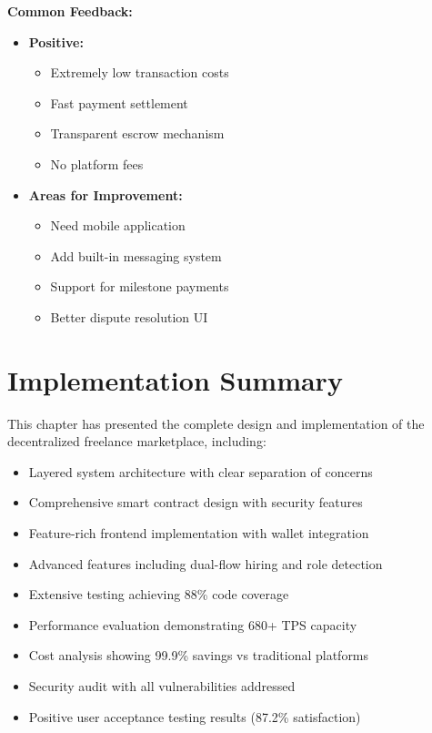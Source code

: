 \documentclass[a4paper,13pt,twoside]{report}
\theoremstyle{definition}
\begin{document}
\textbf{Common Feedback:}
\begin{itemize}
    \item \textbf{Positive:}
    \begin{itemize}
        \item Extremely low transaction costs
        \item Fast payment settlement
        \item Transparent escrow mechanism
        \item No platform fees
    \end{itemize}
    \item \textbf{Areas for Improvement:}
    \begin{itemize}
        \item Need mobile application
        \item Add built-in messaging system
        \item Support for milestone payments
        \item Better dispute resolution UI
    \end{itemize}
\end{itemize}

\section{Implementation Summary}

This chapter has presented the complete design and implementation of the decentralized freelance marketplace, including:

\begin{itemize}
    \item Layered system architecture with clear separation of concerns
    \item Comprehensive smart contract design with security features
    \item Feature-rich frontend implementation with wallet integration
    \item Advanced features including dual-flow hiring and role detection
    \item Extensive testing achieving 88\% code coverage
    \item Performance evaluation demonstrating 680+ TPS capacity
    \item Cost analysis showing 99.9\% savings vs traditional platforms
    \item Security audit with all vulnerabilities addressed
    \item Positive user acceptance testing results (87.2\% satisfaction)
\end{itemize}
\end{document}
